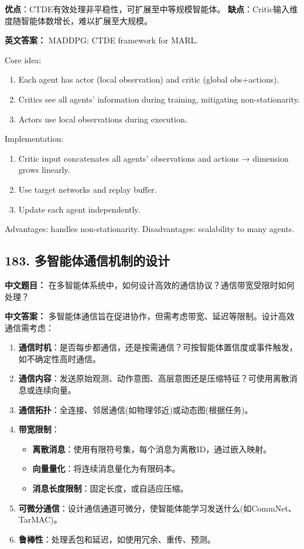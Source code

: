 \documentclass[10pt,a4paper]{ctexart}
\begin{document}
\textbf{优点}：CTDE有效处理非平稳性，可扩展至中等规模智能体。
\textbf{缺点}：Critic输入维度随智能体数增长，难以扩展至大规模。

\textbf{英文答案：}  
MADDPG: CTDE framework for MARL.

Core idea:
\begin{enumerate}
    \item Each agent has actor (local observation) and critic (global obs+actions).
    \item Critics see all agents' information during training, mitigating non-stationarity.
    \item Actors use local observations during execution.
\end{enumerate}

Implementation:
\begin{enumerate}
    \item Critic input concatenates all agents' observations and actions → dimension grows linearly.
    \item Use target networks and replay buffer.
    \item Update each agent independently.
\end{enumerate}

Advantages: handles non-stationarity.
Disadvantages: scalability to many agents.

\subsection*{183. 多智能体通信机制的设计}
\textbf{中文题目：} 在多智能体系统中，如何设计高效的通信协议？通信带宽受限时如何处理？

\textbf{中文答案：}  
多智能体通信旨在促进协作，但需考虑带宽、延迟等限制。设计高效通信需考虑：

\begin{enumerate}
    \item \textbf{通信时机}：是否每步都通信，还是按需通信？可按智能体置信度或事件触发，如不确定性高时通信。
    \item \textbf{通信内容}：发送原始观测、动作意图、高层意图还是压缩特征？可使用离散消息或连续向量。
    \item \textbf{通信拓扑}：全连接、邻居通信(如物理邻近)或动态图(根据任务)。
    \item \textbf{带宽限制}：
        \begin{itemize}
            \item \textbf{离散消息}：使用有限符号集，每个消息为离散ID，通过嵌入映射。
            \item \textbf{向量量化}：将连续消息量化为有限码本。
            \item \textbf{消息长度限制}：固定长度，或自适应压缩。
        \end{itemize}
    \item \textbf{可微分通信}：设计通信通道可微分，使智能体能学习发送什么(如CommNet、TarMAC)。
    \item \textbf{鲁棒性}：处理丢包和延迟，如使用冗余、重传、预测。
\end{enumerate}
\end{document}
